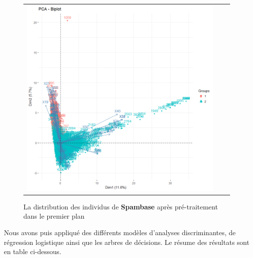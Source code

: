 \documentclass[a4paper,11pt,oneside,roman]{article}
\begin{document}
\begin{figure}[htb]
    \centering
    \begin{tabular}{ccc}
    \includegraphics[scale = .3]{./discrimination/spambase/biplot4.png} &
    \end{tabular}
    \caption{La distribution des individus de \textbf{Spambase} après pré-traitement dans le premier plan}
    \label{fig:my_label}
\end{figure}
Nous avons puis appliqué des différents modèles d'analyses discriminantes, de régression logistique ainsi que les arbres de décisions. Le résume des résultats sont en table ci-dessous.
\end{document}
